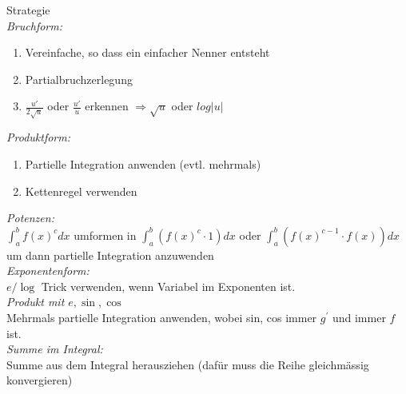 
\begin{KR}{Strategie}
    \\\emph{Bruchform:}
    \begin{enumerate}
        \item Vereinfache, so dass ein einfacher Nenner entsteht
        \item Partialbruchzerlegung
        \item $\frac{u'}{2\sqrt{u}}$ oder $\frac{u'}{u}$ erkennen $\Rightarrow \sqrt{u}$ oder $log|u|$
    \end{enumerate}
    \emph{Produktform:}
    \begin{enumerate}
        \item Partielle Integration anwenden (evtl. mehrmals)
        \item Kettenregel verwenden
    \end{enumerate}
    \emph{Potenzen:}\\
        $\int_{a}^{b} f(x)^{c} d x$ umformen in $\int_{a}^{b}\left(f(x)^{c} \cdot 1\right) d x$ oder $\int_{a}^{b}\left(f(x)^{c-1} \cdot f(x)\right) d x$ um dann partielle Integration anzuwenden\\
    \emph{Exponentenform:}\\
        $e / \log$ Trick verwenden, wenn Variabel im Exponenten ist.\\
    \emph{Produkt mit $e, \sin , \cos$}\\
        Mehrmals partielle Integration anwenden, wobei sin, cos immer $g^{\prime}$ und immer $f$ ist.\\
    \emph{Summe im Integral:}\\
        Summe aus dem Integral herausziehen (dafür muss die Reihe gleichmässig konvergieren)
\end{KR}
